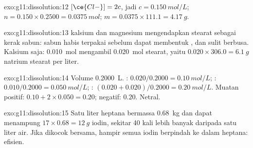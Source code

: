 \begin{solution}{exo:g11:dissolution:12}
$[\ce{Cl-}] = 2c$, jadi $c = \qty{0.150}{mol/L}$;
$n = 0.150 \times 0.2500 = \qty{0.0375}{mol}$;
$m = 0.0375 \times 111.1 = \qty{4.17}{g}$.
\end{solution}

\begin{solution}{exo:g11:dissolution:13}
 kalsium dan magnesium mengendapkan  stearat sebagai kerak
sabun: sabun habis terpakai sebelum dapat membentuk , dan sulit
berbusa. Kalsium saja: \qty{0.010}{mol}  mengambil
\qty{0.020}{mol} stearat, yaitu $0.020 \times 306.0 =
\qty{6.1}{g}$ natrium stearat per liter.
\end{solution}

\begin{solution}{exo:g11:dissolution:14}
Volume \qty{0.2000}{L}. : $0.020 / 0.2000 = \qty{0.10}{mol/L}$;
: $0.010 / 0.2000 = \qty{0.050}{mol/L}$; :
$(0.020 + 0.020) / 0.2000 = \qty{0.20}{mol/L}$. Muatan positif:
$0.10 + 2 \times 0.050 = 0.20$; negatif: $0.20$. Netral.
\end{solution}

\begin{solution}{exo:g11:dissolution:15}
Satu liter heptana bermassa \qty{0.68}{kg} dan dapat menampung
$17 \times 0.68 = \qty{12}{g}$ iodin, sekitar 40 kali lebih banyak
daripada satu liter air. Jika dikocok bersama, hampir semua iodin
berpindah ke dalam heptana:  efisien.
\end{solution}

